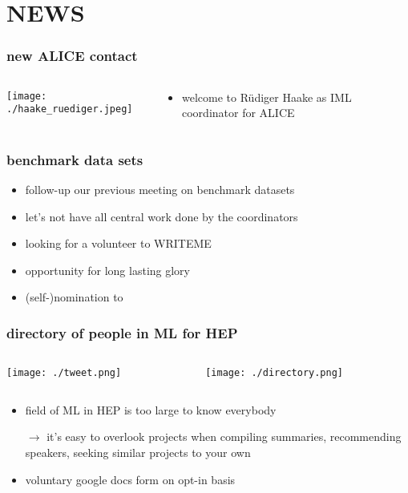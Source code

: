 \maketitle

\section{NEWS}

\begin{frame}
  \frametitle{new ALICE contact}
  \begin{columns}
    \begin{column}{.3\textwidth}
      \texttt{[image: ./haake\_ruediger.jpeg]}
    \end{column}
    \begin{column}{.7\textwidth}
      \begin{itemize}
        \item welcome to Rüdiger Haake as IML coordinator for ALICE
      \end{itemize}
    \end{column}
  \end{columns}
\end{frame}

\begin{frame}
  \frametitle{benchmark data sets}
  \begin{itemize}
    \item follow-up our previous meeting on benchmark datasets
    \item let's not have all central work done by the coordinators
    \item looking for a volunteer to WRITEME
    \item opportunity for long lasting glory
    \item (self-)nomination to 
  \end{itemize}
\end{frame}

\begin{frame}
  \frametitle{directory of people in ML for HEP}
  \begin{columns}
    \begin{column}{.3\textwidth}
      \texttt{[image: ./tweet.png]}
    \end{column}
    \begin{column}{.7\textwidth}
      \texttt{[image: ./directory.png]}
    \end{column}
  \end{columns}
  \begin{itemize}
    \item field of ML in HEP is too large to know everybody
    \item[$\rightarrow$] it's easy to overlook projects when compiling summaries, recommending speakers, seeking similar projects to your own
    \item voluntary google docs form on opt-in basis
  \end{itemize}
\end{frame}

